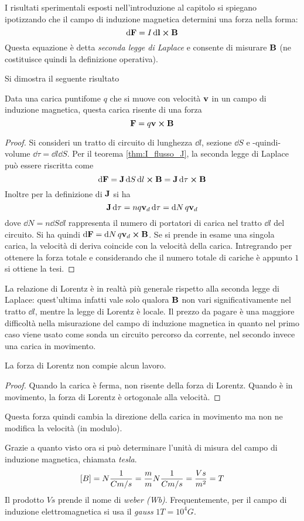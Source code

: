 I risultati sperimentali esposti nell'introduzione al capitolo si spiegano ipotizzando che il 
campo di induzione magnetica determini una forza nella forma:
\begin{equation}
    \dd{\vb{F}}=I\dd{\vb{l}}\cp\vb{B}
\end{equation}
Questa equazione è detta \textit{seconda legge di Laplace} e consente di misurare $\vb{B}$ (ne costituisce quindi
la definizione operativa).

Si dimostra il seguente risultato
\begin{thm}
    Data una carica puntifome $q$ che si muove con velocità $\vb{v}$ in un campo di induzione magnetica, questa carica risente di una forza
    \begin{equation}
        \label{eqn:f_lorentz}
        \vb{F}=q\vb{v}\cp\vb{B}
    \end{equation}
\end{thm}
\begin{proof}
    Si consideri un tratto di circuito di lunghezza $\dd{l}$, sezione $\dd{S}$ e -quindi- volume  
    $\dd{\tau}=\dd{l}\dd{S}$. Per il teorema \ref{thm:I_flusso_J}, la seconda legge di Laplace può essere riscritta come
    \[
        \dd{\vb{F}}=\vb{J}\dd{S}\dd{l}\cp\vb{B}=\vb{J}\dd{\tau}\cp\vb{B}
    \]
    Inoltre per la definizione di $\vb{J}$ si ha
    \[
        \vb{J}\dd{\tau}=nq\vb{v}_d\dd{\tau}=\dd{N}q\vb{v}_d
    \]
    dove $\dd{N}=n\dd{S}\dd{l}$ rappresenta il numero di portatori di carica nel tratto $\dd{l}$ del circuito. 
    Si ha quindi $\dd{\vb{F}}=\dd{N}q\vb{v}_d\cp\vb{B}$. Se si prende in esame una singola carica, 
    la velocità di deriva coincide con la velocità della carica. 
    Intregrando per ottenere la forza totale  e considerando che il numero totale di cariche è appunto $1$ si ottiene la tesi.
\end{proof}
La relazione di Lorentz è in realtà più generale rispetto alla seconda legge di Laplace: quest'ultima infatti vale
solo qualora $\vb{B}$ non vari significativamente nel tratto $\dd{l}$, mentre la legge di Lorentz è locale. Il prezzo
da pagare è una maggiore difficoltà nella misurazione del campo di induzione magnetica in quanto nel primo caso viene
usato come sonda un circuito percorso da corrente, nel secondo invece una carica in movimento.
\begin{cor}
    La forza di Lorentz non compie alcun lavoro.
\end{cor}
\begin{proof}
    Quando la carica è ferma, non risente della forza di Lorentz. Quando è in movimento, la forza di Lorentz è ortogonale alla velocità.
\end{proof}
Questa forza quindi cambia la direzione della carica in movimento ma non ne modifica la velocità (in modulo).

Grazie a quanto visto ora si può determinare l'unità di misura del campo di induzione magnetica, chiamata \textit{tesla}.
\[
    [B]=N\frac{1}{Cm/s}=\frac{m}{m}N\frac{1}{Cm/s}=\frac{Vs}{m^2}=T
\]
Il prodotto $Vs$ prende il nome di \textit{weber (Wb)}. 
Frequentemente, per il campo di induzione elettromagnetica si usa il \textit{gauss} $1T=10^4G$.
